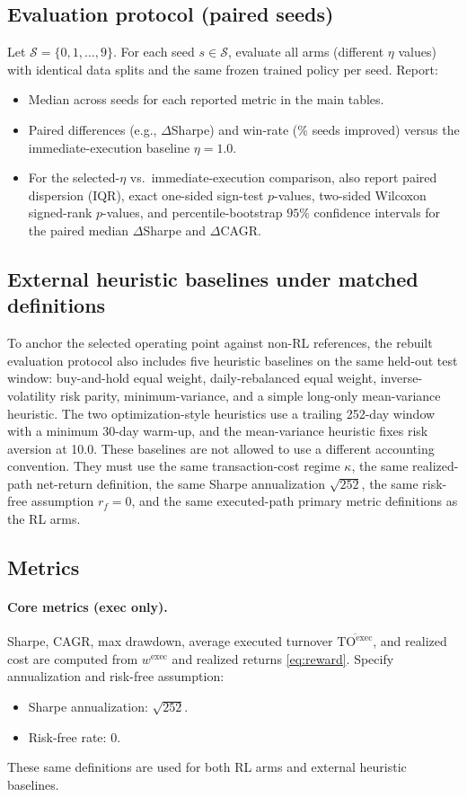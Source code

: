 \documentclass[10pt,twocolumn]{article}
\newcommand{\wexec}{w^{\mathrm{exec}}}
\newcommand{\TOexec}{\mathrm{TO}^{\mathrm{exec}}}
\newcommand{\kappaTC}{\kappa}
\begin{document}
\subsection{Evaluation protocol (paired seeds)}
Let $\mathcal{S}=\{0,1,\dots,9\}$. For each seed $s\in\mathcal{S}$, evaluate all arms (different $\eta$ values) with identical data splits and the same frozen trained policy per seed.
Report:
\begin{itemize}[leftmargin=*,itemsep=1pt]
\item Median across seeds for each reported metric in the main tables.
\item Paired differences (e.g., $\Delta$Sharpe) and win-rate (\% seeds improved) versus the immediate-execution baseline $\eta=1.0$.
\item For the selected-$\eta$ vs.\ immediate-execution comparison, also report paired dispersion (IQR), exact one-sided sign-test $p$-values, two-sided Wilcoxon signed-rank $p$-values, and percentile-bootstrap $95\%$ confidence intervals for the paired median $\Delta$Sharpe and $\Delta$CAGR.
\end{itemize}

\subsection{External heuristic baselines under matched definitions}
To anchor the selected operating point against non-RL references, the rebuilt evaluation protocol also includes five heuristic baselines on the same held-out test window: buy-and-hold equal weight, daily-rebalanced equal weight, inverse-volatility risk parity, minimum-variance, and a simple long-only mean-variance heuristic. The two optimization-style heuristics use a trailing 252-day window with a minimum 30-day warm-up, and the mean-variance heuristic fixes risk aversion at 10.0. These baselines are not allowed to use a different accounting convention. They must use the same transaction-cost regime $\kappaTC$, the same realized-path net-return definition, the same Sharpe annualization $\sqrt{252}$, the same risk-free assumption $r_f=0$, and the same executed-path primary metric definitions as the RL arms.

\subsection{Metrics}
\paragraph{Core metrics (exec only).}
Sharpe, CAGR, max drawdown, average executed turnover $\overline{\TOexec}$, and realized cost are computed from $\wexec$ and realized returns \eqref{eq:reward}. Specify annualization and risk-free assumption:
\begin{itemize}[leftmargin=*,itemsep=1pt]
\item Sharpe annualization: $\sqrt{252}$.
\item Risk-free rate: 0.
\end{itemize}
These same definitions are used for both RL arms and external heuristic baselines.
\end{document}
